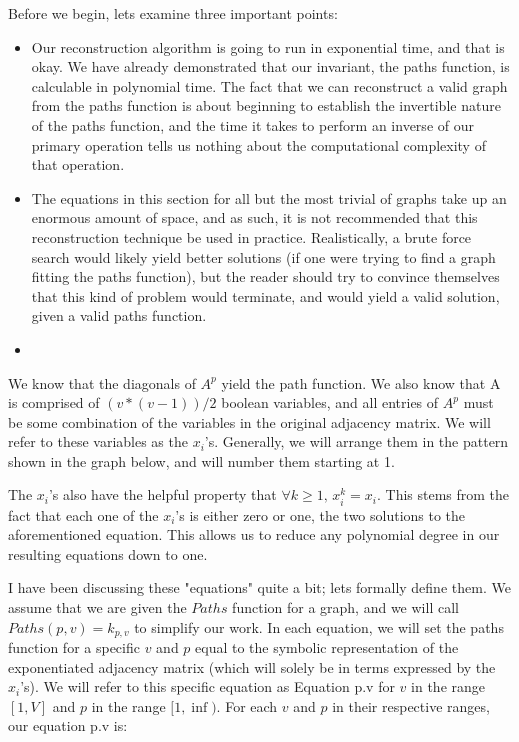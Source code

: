\documentclass[a4paper,12pt]{article}
\begin{document}
Before we begin, lets examine three important points:
\begin{itemize}
  \item{Our reconstruction algorithm is going to run in exponential time, and that is okay.  We have already demonstrated that our invariant, the paths function, is calculable in polynomial time.  The fact that we can reconstruct a valid graph from the paths function is about beginning to establish the invertible nature of the paths function, and the time it takes to perform an inverse of our primary operation tells us nothing about the computational complexity of that operation.}
  \item{The equations in this section for all but the most trivial of graphs take up an enormous amount of space, and as such, it is not recommended that this reconstruction technique be used in practice.  Realistically, a brute force search would likely yield better solutions (if one were trying to find a graph fitting the paths function), but the reader should try to convince themselves that this kind of problem would terminate, and would yield a valid solution, given a valid paths function.}
  \item{}

\end{itemize}

We know that the diagonals of \(A^p\) yield the path function.  We also know that A is comprised of \((v * (v - 1)) / 2\) boolean variables, and all entries of \(A^p\) must be some combination of the variables in the original adjacency matrix. We will refer to these variables as the \(x_i\)'s. Generally, we will arrange them in the pattern shown in the graph below, and will number them starting at 1.

The \(x_i\)'s also have the helpful property that \(\forall k \geq 1,\, x_i^k = x_i \). This stems from the fact that each one of the \(x_i\)'s is either zero or one, the two solutions to the aforementioned equation.  This allows us to reduce any polynomial degree in our resulting equations down to one.

I have been discussing these "equations" quite a bit; lets formally define them.  We assume that we are given the \(Paths\) function for a graph, and we will call \(Paths(p, v) = k_{p, v}\) to simplify our work. In each equation, we will set the paths function for a specific \(v\) and \(p\) equal to the symbolic representation of the exponentiated adjacency matrix (which will solely be in terms expressed by the \(x_i\)'s).  We will refer to this specific equation as Equation p.v for \(v\) in the range \([1, V]\) and \(p\) in the range \([1, \inf)\).  For each \(v\) and \(p\) in their respective ranges, our equation p.v is:
\end{document}
